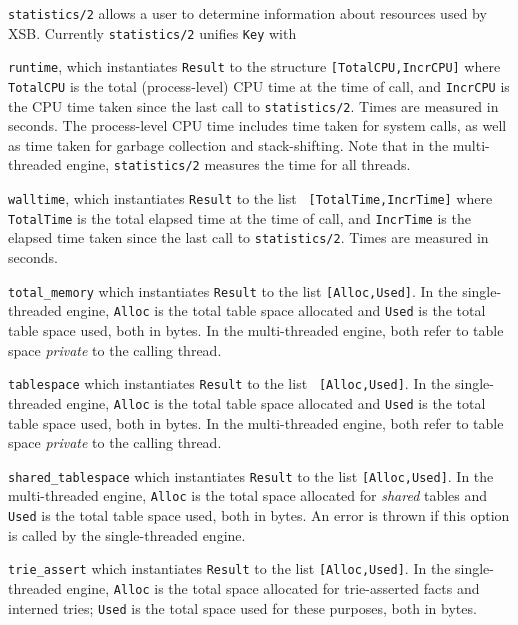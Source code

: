 \begin{description}
%
{\tt statistics/2} allows a user to determine information about
resources used by XSB.  Currently {\tt statistics/2} unifies {\tt Key}
with
\bi
\item {\tt runtime}, which instantiates {\tt Result} to the structure
  {\tt [TotalCPU,IncrCPU]} where {\tt TotalCPU} is the total
  (process-level) CPU time at the time of call, and {\tt IncrCPU} is
  the CPU time taken since the last call to {\tt statistics/2}.  Times
  are measured in seconds.  The process-level CPU time includes time
  taken for system calls, as well as time taken for garbage collection
  and stack-shifting.  Note that in the multi-threaded engine,
  {\tt statistics/2} measures the time for all threads.
%
\item {\tt walltime}, which instantiates {\tt Result} to the list {\tt
 [TotalTime,IncrTime]} where {\tt TotalTime} is the total elapsed time
 at the time of call, and {\tt IncrTime} is the elapsed time taken
 since the last call to {\tt statistics/2}.  Times are measured in
 seconds.
%
\item {\tt total\_memory} which instantiates {\tt Result} to the list
 {\tt [Alloc,Used]}.  In the single-threaded engine, {\tt Alloc} is
 the total table space allocated and {\tt Used} is the total table
 space used, both in bytes.  In the multi-threaded engine, both refer
 to table space {\em private} to the calling thread.
%
\item {\tt tablespace} which instantiates {\tt Result} to the list {\tt
 [Alloc,Used]}.  In the single-threaded engine, {\tt Alloc} is the
 total table space allocated and {\tt Used} is the total table space
 used, both in bytes.  In the multi-threaded engine, both refer to
 table space {\em private} to the calling thread.
%
\item {\tt shared\_tablespace} which instantiates {\tt Result} to the
 list {\tt [Alloc,Used]}.  In the multi-threaded engine, {\tt Alloc}
 is the total space allocated for {\em shared} tables and {\tt Used}
 is the total table space used, both in bytes.  An error is thrown if
 this option is called by the single-threaded engine.
%
\item {\tt trie\_assert} which instantiates {\tt Result} to the list
 {\tt [Alloc,Used]}.  In the single-threaded engine, {\tt Alloc} is
 the total space allocated for trie-asserted facts and interned tries;
 {\tt Used} is the total space used for these purposes, both in bytes.
%

\end{description}
